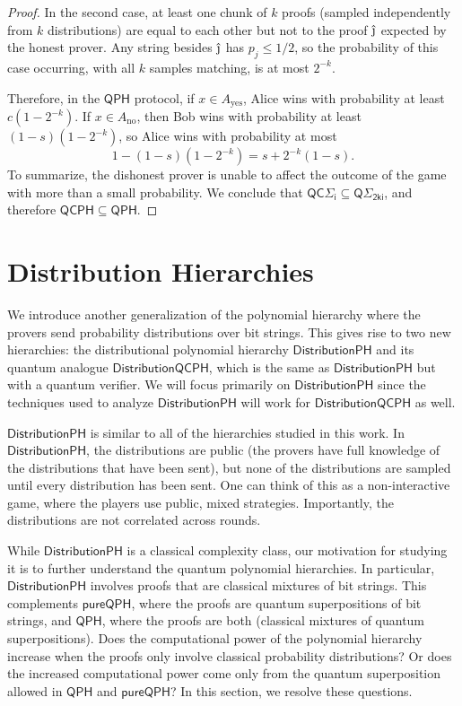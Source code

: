 \documentclass[10pt,a4paper]{article}
\theoremstyle{definition}
\newcommand{\yes}{\text{yes}}
\newcommand{\no}{\text{no}}
\newcommand{\class}[1]{\ensuremath{\mathsf{#1}}\xspace}
\newcommand{\QCPH}{\class{QCPH}}
\newcommand{\QCSigmai}[1][i]{\class{QC\Sigma_{#1}}}
\newcommand{\QPH}{\class{QPH}}
\newcommand{\QSigmai}[1][i]{\class{Q\Sigma_{#1}}}
\newcommand{\pureQPH}{\class{pureQPH}}
\newcommand{\distributionPH}{\mixedPH}
\newcommand{\distributionQCPH}{\mathsf{DistributionQCPH}}
\newcommand{\mixedPH}{\class{DistributionPH}}
\begin{document}
\begin{proof}
    In the second case, at least one chunk of $k$ proofs (sampled independently from $k$ distributions) 
    are equal to each other but not to the proof $\hat{\text{\j}}$ expected by the honest prover. 
    Any string besides $\hat{\text{\j}}$ has $p_j \leq 1/2$,
    so the probability of this case occurring, with all $k$ samples matching, is at most $2^{-k}$. 
    
    Therefore, in the $\QPH$ protocol, if $x \in A_\yes$, Alice wins with probability at least $c\left(1 -2^{-k}\right)$. If $x \in A_\no$, then Bob wins with probability at least $(1-s)\left(1-2^{-k}\right)$, so Alice wins with probability at most 
    \[
    1 - (1-s)\left(1-2^{-k}\right) = s + 2^{-k}(1 - s).
    \]
    To summarize, the dishonest prover is unable to affect the outcome of the game with more than a small probability. 
    We conclude that $\QCSigmai \subseteq \QSigmai[2ki]$, and therefore $\QCPH\subseteq \QPH$. 
\end{proof}


\section{Distribution Hierarchies}\label{sec:mixed}

We introduce another generalization of the polynomial hierarchy where the provers send probability distributions over bit strings. 
This gives rise to two new hierarchies: the distributional polynomial hierarchy $\distributionPH$ and its quantum analogue $\distributionQCPH$, which is the same as $\distributionPH$ but with a quantum verifier.
We will focus primarily on $\distributionPH$ since the techniques used to analyze $\distributionPH$ will work for $\distributionQCPH$ as well.








$\mixedPH$ is similar to all of the hierarchies studied in this work.
In $\mixedPH$, the distributions are public (the provers have full knowledge of the distributions that have been sent), but none of the distributions are sampled until every distribution has been sent.
One can think of this as a non-interactive game, where the players use public, mixed strategies. 
Importantly, the distributions are not correlated across rounds. 

While $\mixedPH$ is a classical complexity class, our motivation for studying it is to further understand the quantum polynomial hierarchies. 
In particular, $\mixedPH$ involves proofs that are classical mixtures of bit strings. 
This complements $\pureQPH$, where the proofs are quantum superpositions of bit strings, and $\QPH$, where the proofs are both (classical mixtures of quantum superpositions).
Does the computational power of the polynomial hierarchy increase when the proofs only involve classical probability distributions? Or does the increased computational power come only from the quantum superposition allowed in $\QPH$ and $\pureQPH$?
In this section, we resolve these questions. 
\end{document}
